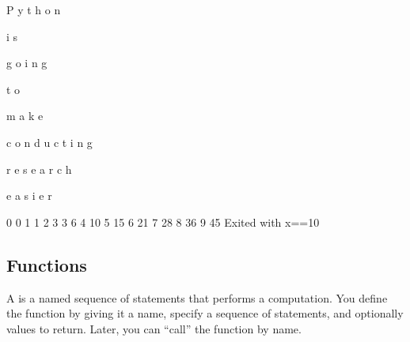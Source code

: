 \documentclass[letterpaper,10pt,english]{sphinxmanual}
\begin{document}
\begin{sphinxVerbatim}[commandchars=\\\{\}]
  
   
\end{sphinxVerbatim}

\begin{sphinxVerbatim}[commandchars=\\\{\}]
P
y
t
h
o
n
 
i
s
 
g
o
i
n
g
 
t
o
 
m
a
k
e
 
c
o
n
d
u
c
t
i
n
g
 
r
e
s
e
a
r
c
h
 
e
a
s
i
e
r
\end{sphinxVerbatim}

\begin{sphinxVerbatim}[commandchars=\\\{\}]
  
  

  
   
      
     
      
\end{sphinxVerbatim}

\begin{sphinxVerbatim}[commandchars=\\\{\}]
0 0
1 1
2 3
3 6
4 10
5 15
6 21
7 28
8 36
9 45
Exited with x==10
\end{sphinxVerbatim}


\subsection{Functions}
\label{\detokenize{content/Introduction_to_Programming:functions}}
A  is a named sequence of statements that performs a computation.  You define the function by giving it a name, specify a sequence of statements, and optionally values to return.  Later, you can “call” the function by name.
\end{document}

